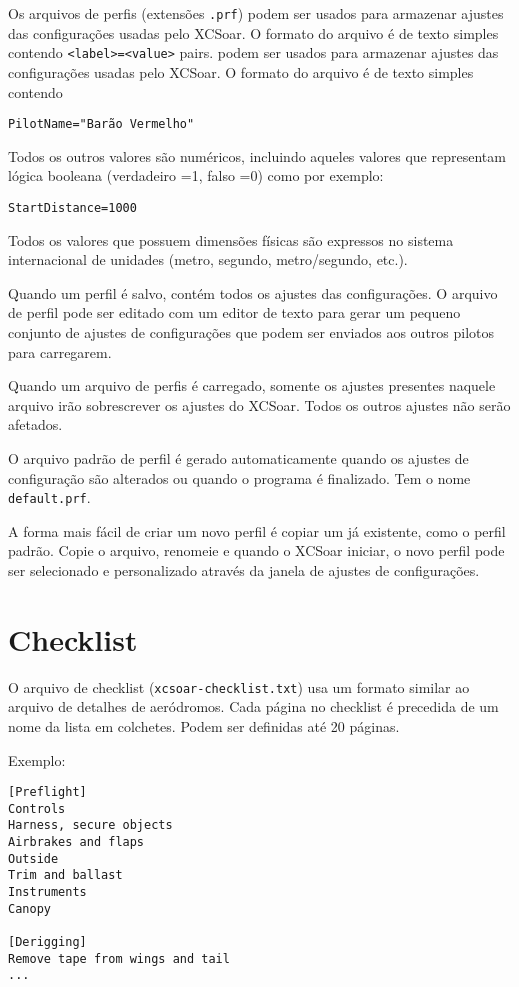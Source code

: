 Os arquivos de perfis (extensões \verb|.prf|) podem ser usados para armazenar ajustes das configurações usadas pelo XCSoar.  O formato do arquivo é de texto simples contendo \verb|<label>=<value>| pairs.  podem ser usados para armazenar ajustes das configurações usadas pelo XCSoar.  O formato do arquivo é de texto simples contendo
\begin{verbatim}
PilotName="Barão Vermelho"
\end{verbatim}
Todos os outros valores são numéricos, incluindo aqueles valores que representam lógica booleana (verdadeiro =1, falso =0) como por exemplo:
\begin{verbatim}
StartDistance=1000
\end{verbatim}

Todos os valores que possuem dimensões físicas são expressos no sistema internacional de unidades (metro, segundo, metro/segundo, etc.).

Quando um perfil é salvo, contém todos os ajustes das configurações.  O arquivo de perfil pode ser editado com um editor de texto para gerar um pequeno conjunto de ajustes de configurações que podem ser enviados aos outros pilotos para carregarem.

Quando um arquivo de perfis é carregado, somente os ajustes presentes naquele arquivo irão sobrescrever os ajustes do XCSoar.  Todos os outros ajustes não serão afetados.

O arquivo padrão de perfil é gerado automaticamente quando os ajustes de configuração são alterados ou quando o programa é finalizado.  Tem o nome \verb|default.prf|.

A forma mais fácil de criar um novo perfil é copiar um já existente, como o perfil padrão.  Copie o arquivo, renomeie e quando o XCSoar iniciar, o novo perfil pode ser selecionado e personalizado através da janela de ajustes de configurações. 


\section{Checklist}\label{sec:checklist-file}

O arquivo de checklist (\verb|xcsoar-checklist.txt|) usa um formato similar ao arquivo de detalhes de aeródromos.  Cada página no checklist é precedida de um nome da lista em colchetes.  Podem ser definidas até 20 páginas.

Exemplo:

\begin{verbatim}
[Preflight]
Controls
Harness, secure objects
Airbrakes and flaps
Outside
Trim and ballast
Instruments
Canopy

[Derigging]
Remove tape from wings and tail
...
\end{verbatim}

